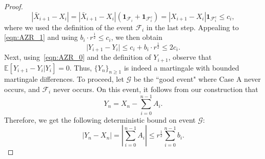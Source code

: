 \documentclass{article}
\newcommand{\mc}{\mathcal}
\begin{document}
\begin{proof}
$$ |\bar{X}_{i+1} - X_i| = |\bar{X}_{i+1} - X_i| \left(\mathbf{1}_{\mc{F}_i} + \mathbf{1}_{\mc{F}^c_i}\right) =  |{X}_{i+1} - X_i| \mathbf{1}_{\mc{F}^c_i} \leq c_i, 
$$
where we used the definition of the event $\mc{F}_i$ in the last step. Appealing to \eqref{eqn:AZR_1} and using $b_i \cdot r^{\frac{1}{2}} \leq c_i$, we then obtain
    \[
        \lvert Y_{i+1} - Y_i \rvert \leq c_i + b_i \cdot r^{\frac{1}{2}} \le 2c_i.
    \]
Next, using~\eqref{eqn:AZR_0} and the definition of $Y_{i+1}$, observe that \( \mathbb{E}[Y_{i+1} - Y_i \lvert Y_i] = 0 \). Thus, \(\{Y_n\}_{n \geq 1}\) is indeed a martingale with bounded martingale differences. To proceed, let $\mc{G}$ be the ``good event" where Case A never occurs, and $\mc{F}_i$ never occurs. On this event, it follows from our construction that 
    \[
        Y_n = X_n - \sum_{i=0}^{n-1} A_i.
    \]
    Therefore, we get the following deterministic bound on event $\mc{G}$:
   \begin{equation}
        |Y_n - X_n| = \left| \sum_{i=0}^{n-1} A_i \right| \leq r^{\frac{1}{2}} \sum_{i=0}^{n-1} b_i.
    \label{eqn:AZR_2}
  \end{equation}


\end{proof}
\end{document}
